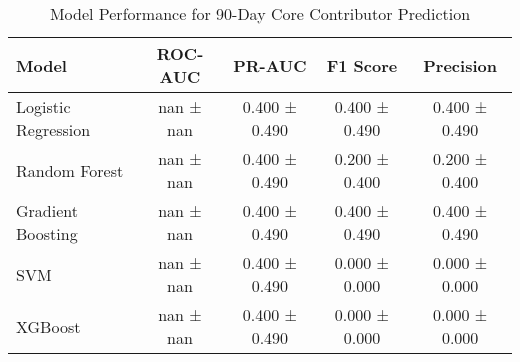 \begin{table}[htbp]
\centering
\caption{Model Performance for 90-Day Core Contributor Prediction}
\label{tab:model_performance}
\begin{tabular}{lcccc}
\toprule
Model & ROC-AUC & PR-AUC & F1 Score & Precision \\
\midrule
Logistic Regression & nan ± nan & 0.400 ± 0.490 & 0.400 ± 0.490 & 0.400 ± 0.490 \\
Random Forest & nan ± nan & 0.400 ± 0.490 & 0.200 ± 0.400 & 0.200 ± 0.400 \\
Gradient Boosting & nan ± nan & 0.400 ± 0.490 & 0.400 ± 0.490 & 0.400 ± 0.490 \\
SVM & nan ± nan & 0.400 ± 0.490 & 0.000 ± 0.000 & 0.000 ± 0.000 \\
XGBoost & nan ± nan & 0.400 ± 0.490 & 0.000 ± 0.000 & 0.000 ± 0.000 \\
\bottomrule
\end{tabular}
\end{table}